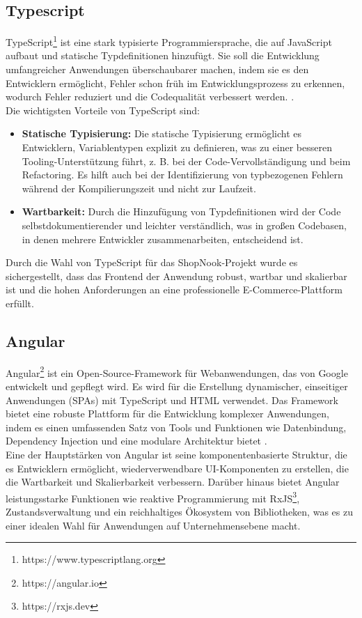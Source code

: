 \subsection{Typescript}

TypeScript\footnote{https://www.typescriptlang.org} ist eine stark typisierte Programmiersprache, die auf JavaScript aufbaut und statische Typdefinitionen hinzufügt. Sie soll die Entwicklung umfangreicher Anwendungen überschaubarer machen, indem sie es den Entwicklern ermöglicht, Fehler schon früh im Entwicklungsprozess zu erkennen, wodurch Fehler reduziert und die Codequalität verbessert werden. \cite{Typescript:2024}.\\
Die wichtigsten Vorteile von TypeScript sind:
\begin{itemize}
	\item \textbf{Statische Typisierung:} Die statische Typisierung  ermöglicht es Entwicklern, Variablentypen explizit zu definieren, was zu einer besseren Tooling-Unterstützung führt, z. B. bei der Code-Vervollständigung und beim Refactoring. Es hilft auch bei der Identifizierung von typbezogenen Fehlern während der Kompilierungszeit und nicht zur Laufzeit.
	\item \textbf{Wartbarkeit:} Durch die Hinzufügung von Typdefinitionen wird der Code selbstdokumentierender und leichter verständlich, was in großen Codebasen, in denen mehrere Entwickler zusammenarbeiten, entscheidend ist.
\end{itemize}
Durch die Wahl von TypeScript für das ShopNook-Projekt wurde es sichergestellt, dass das Frontend der Anwendung robust, wartbar und skalierbar ist und die hohen Anforderungen an eine professionelle E-Commerce-Plattform erfüllt.

\subsection{Angular}

Angular\footnote{https://angular.io} ist ein Open-Source-Framework für Webanwendungen, das von Google entwickelt und gepflegt wird. Es wird für die Erstellung dynamischer, einseitiger Anwendungen (SPAs) mit TypeScript und HTML verwendet. Das Framework bietet eine robuste Plattform für die Entwicklung komplexer Anwendungen, indem es einen umfassenden Satz von Tools und Funktionen wie Datenbindung, Dependency Injection und eine modulare Architektur bietet \cite{Angular:2024}.\\
Eine der Hauptstärken von Angular ist seine komponentenbasierte Struktur, die es Entwicklern ermöglicht, wiederverwendbare UI-Komponenten zu erstellen, die die Wartbarkeit und Skalierbarkeit verbessern. Darüber hinaus bietet Angular leistungsstarke Funktionen wie reaktive Programmierung mit RxJS\footnote{https://rxjs.dev}, Zustandsverwaltung und ein reichhaltiges Ökosystem von Bibliotheken, was es zu einer idealen Wahl für Anwendungen auf Unternehmensebene macht.

